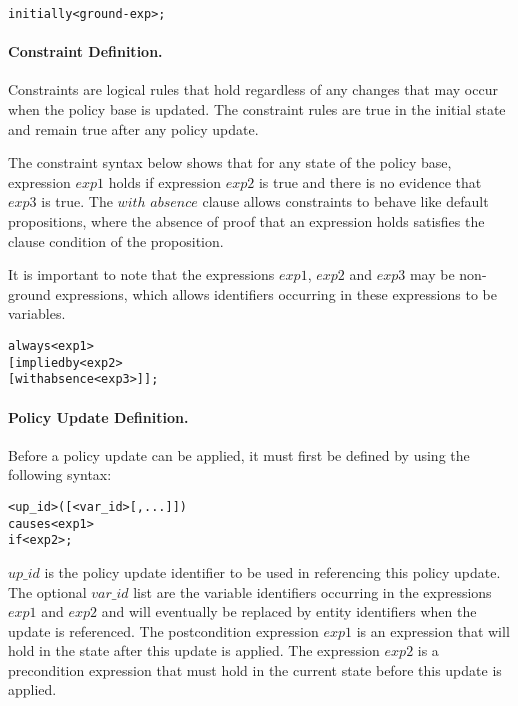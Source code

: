 \documentclass[11pt, twocolumn]{article}
\newenvironment{vverbatim}
  {\begin{alltt}}
  {\vspace{-\baselineskip}\end{alltt}}
\begin{document}
          \begin{vverbatim}
  initially <ground-exp>;
          \end{vverbatim}

        \paragraph{Constraint Definition.}

          Constraints are logical rules that hold regardless of any changes
          that may occur when the policy base is updated. The constraint rules
          are true in the initial state and remain true after any policy
          update.

          The constraint syntax below shows that for any state of the policy
          base, expression $exp1$ holds if expression $exp2$ is true and there
          is no evidence that $exp3$ is true. The $with$ $absence$ clause
          allows constraints to behave like default propositions, where the
          absence of proof that an expression holds  satisfies the clause
          condition of the proposition.

          It is important to note that the expressions $exp1$, $exp2$ and
          $exp3$ may be non-ground expressions, which allows identifiers
          occurring in these expressions to be variables.

          \begin{vverbatim}
  always <exp1>
    [implied by <exp2>
    [with absence <exp3>]];
          \end{vverbatim}

        \paragraph{Policy Update Definition.}

          Before a policy update can be applied, it must first be defined by
          using the following syntax:

          \begin{vverbatim}
  <up\_id>([<var\_id>[, ...]])
    causes <exp1>
    if <exp2>;
          \end{vverbatim}

          $up\_id$ is the policy update identifier to be used in referencing
          this policy update. The optional $var\_id$ list are the variable
          identifiers occurring in the expressions $exp1$ and $exp2$ and will
          eventually be replaced by entity identifiers when the update is
          referenced. The postcondition expression $exp1$ is an expression that
          will hold in the state after this update is applied. The expression
          $exp2$ is a precondition expression that must hold in the current
          state before this update is applied.
\end{document}

